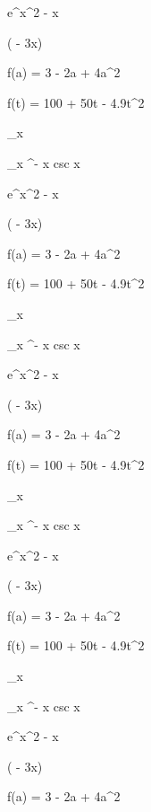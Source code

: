 \documentclass[11pt,a4paper]{article}
\begin{document}
 e^{x^2 - x}

 

 ( - 3x)

f(a) = 3 - 2a + 4a^2

f(t) = 100 + 50t - 4.9t^2

\lim_{x } 

\lim_{x \pi^-} x csc x

 

 e^{x^2 - x}

 

 ( - 3x)

f(a) = 3 - 2a + 4a^2

f(t) = 100 + 50t - 4.9t^2

\lim_{x } 

\lim_{x \pi^-} x csc x

 

 e^{x^2 - x}

 

 ( - 3x)

f(a) = 3 - 2a + 4a^2

f(t) = 100 + 50t - 4.9t^2

\lim_{x } 

\lim_{x \pi^-} x csc x

 

 e^{x^2 - x}

 

 ( - 3x)

f(a) = 3 - 2a + 4a^2

f(t) = 100 + 50t - 4.9t^2

\lim_{x } 

\lim_{x \pi^-} x csc x

 

 e^{x^2 - x}

 

 ( - 3x)

f(a) = 3 - 2a + 4a^2
\end{document}

